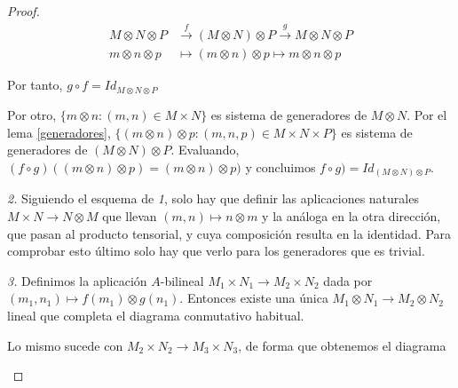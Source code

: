 \documentclass[../main.tex]{subfiles}
\begin{document}
\begin{proof}
	\begin{align*}
	M\otimes N \otimes P &\overset{f}{\longrightarrow}(M\otimes N )\otimes P \overset{g}{\longrightarrow}M\otimes N \otimes P\\
	m\otimes n\otimes p &\longmapsto (m\otimes n)\otimes p \longmapsto m\otimes n\otimes p
	\end{align*}

	Por tanto, $g\circ f=Id_{M\otimes N\otimes P}$

	Por otro, $\{m\otimes n:(m,n)\in M\times N\}$ es sistema de generadores de $M\otimes N$. Por el lema \ref{generadores}, $\{(m\otimes n)\otimes p: (m,n,p)\in M\times N\times P\}$ es sistema de generadores de $(M\otimes N)\otimes P$. Evaluando, $(f\circ g)((m\otimes n)\otimes p)=(m\otimes n)\otimes p)$ y concluimos $f\circ g)=Id_{(M\otimes N)\otimes P}$.

	\textit{2.} Siguiendo el esquema de \textit{1}, solo hay que definir las aplicaciones naturales $M\times N \to N\otimes M$ que llevan $(m,n)\mapsto n\otimes m$ y la análoga en la otra dirección, que pasan al producto tensorial, y cuya composición resulta en la identidad. Para comprobar esto último solo hay que verlo para los generadores que es trivial.

	\textit{3.} Definimos la aplicación $A$-bilineal $M_1\times N_1 \to M_2\times N_2$ dada por $(m_1,n_1) \mapsto f(m_1)\otimes g(n_1)$. Entonces existe una única $M_1\otimes N_1 \to M_2 \otimes N_2$ lineal que completa el diagrama conmutativo habitual.

	Lo mismo sucede con $M_2\times N_2 \to M_3\times N_3$, de forma que obtenemos el diagrama

	\begin{figure}[h!]
		\centering



		\begin{tikzpicture}[x=0.75pt,y=0.75pt,yscale=-1,xscale=1]



\end{tikzpicture}
\end{figure}
\end{proof}
\end{document}
